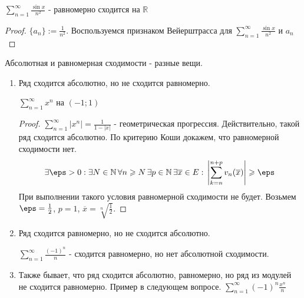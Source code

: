 \begin{example} \thmslashn

  $\sum\limits_{n = 1}^{\infty}{\frac{\sin{x}}{n^2}}$ - равномерно сходится на $\mathbb{R}$
  \begin{proof} \thmslashn

    $\{a_n\} := \frac{1}{n^2}$. Воспользуемся признаком Вейерштрасса для $\sum\limits_{n = 1}^{\infty}{\frac{\sin{x}}{n^2}} \text{ и } a_n$
  \end{proof}
\end{example}

\begin{remark} \thmslashn

  Абсолютная и равномерная сходимости - разные вещи.

  \begin{enumerate}
  \item
    Ряд сходится абсолютно, но не сходится равномерно.
    \begin{example} \thmslashn

      $\sum\limits_{n = 1}^{\infty}{x^n}$ на $(-1; 1)$
      \begin{proof} \thmslashn

        $\sum\limits_{n = 1}^{\infty}{|x^{n}|} = \frac{1}{1 - |x|}$  - геометрическая прогрессия. Действительно, такой ряд сходится абсолютно. По критерию Коши докажем, что равномерной сходимости нет.
        \[\begin{aligned}
          \exists \eps > 0 : \exists N \in \mathbb{N}\, \forall n \geqslant N \,\exists p \in \mathbb{N} \,\exists \overline{x} \in E: \,\left|\sum\limits_{k = n}^{n+p}{v_n(\overline{x})}\right| \geqslant \eps
        \end{aligned}\]
        При выполнении такого условия равномерной сходимости не будет. Возьмем $\eps = \frac{1}{2}$, $p = 1$, $\overline{x} = \sqrt[n]{\frac{1}{2}}$.
      \end{proof}
    \end{example}
  \item
    Ряд сходится равномерно, но не сходится абсолютно.
    \begin{example} \thmslashn

      $\sum\limits_{n = 1}^{\infty}{\frac{(-1)^n}{n}}$ - сходится равномерно, но нет абсолютной сходимости.
    \end{example}
  \item
    Также бывает, что ряд сходится абсолютно, равномерно, но ряд из модулей не сходится равномерно.
    Пример в следующем вопросе. $\sum\limits_{n = 1}^{\infty}{(-1)^n\frac{x^n}{n}}$
  \end{enumerate}
\end{remark}


